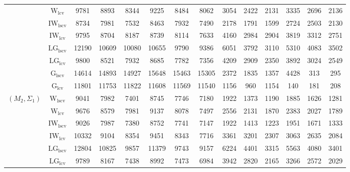 \begin{table}[!ht]
{\begin{tabular}{@{}cc|ccc|ccc|ccc|ccc@{}}
 & $\mathrm{W}_{\mathrm{lcv}}$ & 9781 & 8893 & 8344 & 9225 & 8484 & 8062 & 3054 & 2422 & 2131 & 3335 & 2696 & 2136 \\ 
 & $\mathrm{IW}_{\mathrm{lscv}}$ & \cellcolor{black!30}8734 & \cellcolor{black!30}7981 & \cellcolor{black!30}7532 & \cellcolor{black!30}8463 & \cellcolor{black!10}7932 & \cellcolor{black!10}7490 & 2178 & 1791 & 1599 & 2724 & 2503 & 2130 \\ 
 & $\mathrm{IW}_{\mathrm{lcv}}$ & 9795 & 8704 & 8187 & 8739 & 8114 & 7633 & 4160 & 2984 & 2904 & 3819 & 3312 & 2751 \\ 
 & $\mathrm{LG}_{\mathrm{lscv}}$ & 12190 & 10609 & 10080 & 10655 & 9790 & 9386 & 6051 & 3792 & 3110 & 5310 & 4083 & 3502 \\ 
 & $\mathrm{LG}_{\mathrm{lcv}}$ & 9800 & 8521 & 7932 & \cellcolor{black!10}8685 & \cellcolor{black!30}7782 & \cellcolor{black!30}7356 & 4209 & 2909 & 2350 & 3892 & 3024 & 2549 \\ 
 & $\mathrm{G}_{\mathrm{lscv}}$ & 14614 & 14893 & 14927 & 15648 & 15463 & 15305 & 2372 & 1835 & \cellcolor{black!10}1357 & 4428 & \cellcolor{black!10}313 & \cellcolor{black!10}295 \\ 
 & $\mathrm{G}_{\mathrm{lcv}}$ & 11801 & 11753 & 11822 & 11608 & 11569 & 11540 & \cellcolor{black!30}1156 & \cellcolor{black!30}960 & \cellcolor{black!30}1154 & \cellcolor{black!30}140 & \cellcolor{black!30}181 & \cellcolor{black!30}208 \\ 
\midrule
$(M_2,\Sigma_1)$ & $\mathrm{W}_{\mathrm{lscv}}$ & \cellcolor{black!10}9041 & \cellcolor{black!30}7982 & \cellcolor{black!10}7401 & \cellcolor{black!30}8745 & 7746 & 7180 & 1922 & 1373 & 1190 & 1885 & 1626 & 1281 \\ 
 & $\mathrm{W}_{\mathrm{lcv}}$ & 9676 & 8579 & 7981 & 9137 & 8078 & 7497 & 2556 & 2131 & 1870 & 2383 & 2027 & 1789 \\ 
 & $\mathrm{IW}_{\mathrm{lscv}}$ & \cellcolor{black!30}9026 & \cellcolor{black!10}7987 & \cellcolor{black!30}7380 & \cellcolor{black!10}8752 & \cellcolor{black!10}7741 & \cellcolor{black!10}7147 & 1922 & 1413 & 1223 & 1951 & 1671 & 1333 \\ 
 & $\mathrm{IW}_{\mathrm{lcv}}$ & 10332 & 9104 & 8354 & 9451 & 8343 & 7716 & 3361 & 3201 & 2307 & 3063 & 2635 & 2084 \\ 
 & $\mathrm{LG}_{\mathrm{lscv}}$ & 12804 & 10825 & 9857 & 11379 & 9743 & 9157 & 6224 & 4401 & 3315 & 5563 & 4080 & 3401 \\ 
 & $\mathrm{LG}_{\mathrm{lcv}}$ & 9789 & 8167 & 7438 & 8992 & \cellcolor{black!30}7473 & \cellcolor{black!30}6984 & 3942 & 2820 & 2165 & 3266 & 2572 & 2029 \\ 

\end{tabular}}
\end{table}
